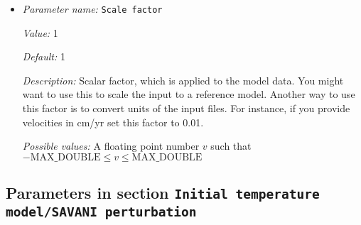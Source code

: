 \begin{itemize}
{\it Possible values:} Any string
\item {\it Parameter name:} {\tt Scale factor}
\label{parameters:Initial temperature model/S40RTS perturbation/Ascii data vs to density model/Scale factor}
\label{parameters:Initial_20temperature_20model/S40RTS_20perturbation/Ascii_20data_20vs_20to_20density_20model/Scale_20factor}


{\it Value:} 1


{\it Default:} 1


{\it Description:} Scalar factor, which is applied to the model data. You might want to use this to scale the input to a reference model. Another way to use this factor is to convert units of the input files. For instance, if you provide velocities in cm/yr set this factor to 0.01.


{\it Possible values:} A floating point number $v$ such that $-\text{MAX\_DOUBLE} \leq v \leq \text{MAX\_DOUBLE}$
\end{itemize}

\subsection{Parameters in section \tt Initial temperature model/SAVANI perturbation}
\label{parameters:Initial_20temperature_20model/SAVANI_20perturbation}

